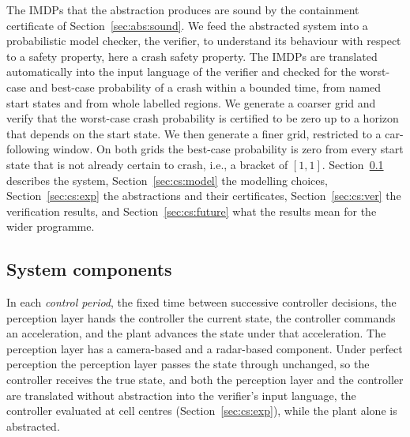 \documentclass[11pt,a4paper]{article}
\theoremstyle{plain}
\theoremstyle{remark}
\begin{document}
	The IMDPs that the abstraction produces are sound by the containment certificate of Section~\ref{sec:abs:sound}. We feed the abstracted system into a probabilistic model checker, the verifier, to understand its behaviour with respect to a safety property, here a crash safety property. The IMDPs are translated automatically into the input language of the verifier and checked for the worst-case and best-case probability of a crash within a bounded time, from named start states and from whole labelled regions. We generate a coarser grid and verify that the worst-case crash probability is certified to be zero up to a horizon that depends on the start state. We then generate a finer grid, restricted to a car-following window. On both grids the best-case probability is zero from every start state that is not already certain to crash, i.e., a bracket of $[1,1]$. Section~\ref{sec:cs:sys} describes the system, Section~\ref{sec:cs:model} the modelling choices, Section~\ref{sec:cs:exp} the abstractions and their certificates, Section~\ref{sec:cs:ver} the verification results, and Section~\ref{sec:cs:future} what the results mean for the wider programme.
	
	\subsection{System components}
	\label{sec:cs:sys}
	
	In each \emph{control period}, the fixed time between successive controller decisions, the perception layer hands the controller the current state, the controller commands an acceleration, and the plant advances the state under that acceleration. The perception layer has a camera-based and a radar-based component. Under perfect perception the perception layer passes the state through unchanged, so the controller receives the true state, and both the perception layer and the controller are translated without abstraction into the verifier's input language, the controller evaluated at cell centres (Section~\ref{sec:cs:exp}), while the plant alone is abstracted.
	
\end{document}
